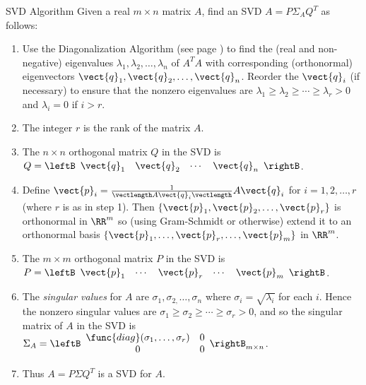 \begin{theorem*}[label=thm:svdalgorithm]{SVD Algorithm}
Given a real $m\times n$ matrix $A$, find an SVD $A=P\Sigma_{A}Q^{T}$ as follows:

\begin{enumerate}
\item Use the Diagonalization Algorithm (see page \pageref{thm:009304}) to find
the (real and non-negative) eigenvalues $\lambda_{1},\lambda_{2},\ldots,\lambda_{n}$ of $A^{T}A$ with corresponding (orthonormal) eigenvectors $\vect{q}_{1},\vect{q}_{2},\ldots ,\vect{q}_{n}$. Reorder
the $\vect{q}_{i}$ (if necessary) to ensure that the nonzero eigenvalues
are $\lambda_{1}\geq \lambda_{2}\geq \cdots \geq \lambda_{r}>0$ and $\lambda_{i}=0$ if $i>r$.

\item The integer $r$ is the rank of the matrix $A$.

\item The $n\times n$ orthogonal matrix $Q$ in the SVD is $Q=\leftB \begin{array}{cccc}\vect{q}_{1} & \vect{q}_{2} & \cdots & \vect{q}_{n}\end{array}\rightB$.

\item Define $\vect{p}_{i}=\frac{1}{\vectlength A\vect{q}_{i}\vectlength}A\vect{q}_{i}$ for $i=1,2,\ldots ,r$ (where $r$ is as in step 1).
Then $\{\vect{p}_{1},\vect{p}_{2},\ldots ,\vect{p}_{r}\}$ is
orthonormal in $\RR^{m}$ so (using Gram-Schmidt or otherwise) extend
it to an orthonormal basis $\{\vect{p}_{1},\ldots ,\vect{p}_{r},\ldots , \vect{p}_{m}\}$ in $\RR^{m}$.

\item The $m\times m$ orthogonal matrix $P$ in the SVD is $P=\leftB \begin{array}{ccccc} \vect{p}_{1} & \cdots & \vect{p}_{r} & \cdots & \vect{p}_{m}\end{array}\rightB$.

\item The \emph{singular values} for $A$ are $\sigma_{1},\sigma_{2,}\ldots,\sigma_{n}$ where $\sigma_{i}=\sqrt{\lambda_{i}}$ for each $i$. Hence the nonzero singular values are $\sigma_{1}\geq \sigma_{2}\geq \cdots \geq \sigma_{r}>0$, and so the singular matrix of $A$ in the SVD is $\Sigma_{A}= 
\leftB 
\begin{array}{cc}
\func{diag}(\sigma_{1},\ldots ,\sigma_{r}) & 0 \\ 
0 & 0
\end{array}
\rightB_{m\times n}$.

\item Thus $A=P\Sigma Q^{T}$ is a SVD for $A$.
\end{enumerate}
\end{theorem*}

